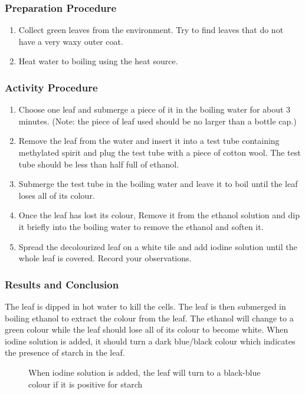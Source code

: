 \subsubsection*{Preparation Procedure}
\begin{enumerate}
\item{Collect green leaves from the environment. Try to find leaves that do not have a very waxy outer coat.}
\item{Heat water to boiling using the heat source.}
\end{enumerate}

\subsubsection*{Activity Procedure}
\begin{enumerate}
\item{Choose one leaf and submerge a piece of it in the boiling water for about 3 minutes. (Note: the piece of leaf used should be no larger than a bottle cap.)}
\item{Remove the leaf from the water and insert it into a test tube containing methylated spirit and plug the test tube with a piece of cotton wool. The test tube should be less than half full of ethanol.}
\item{Submerge the test tube in the boiling water and leave it to boil until the leaf loses all of its colour.}
\item{Once the leaf has lost its colour, Remove it from the ethanol solution and dip it briefly into the boiling water to remove the ethanol and soften it.}
\item{Spread the decolourized leaf on a white tile and add iodine solution until the whole leaf is covered. Record your observations.}
\end{enumerate}

\subsubsection*{Results and Conclusion}
The leaf is dipped in hot water to kill the cells. The leaf is then submerged in boiling ethanol to extract the colour from the leaf. The ethanol will change to a green colour while the leaf should lose all of its colour to become white. When iodine solution is added, it should turn a dark blue/black colour which indicates the presence of starch in the leaf.

\begin{figure}[h]
\begin{center}
\def\svgwidth{6cm}

\caption{When iodine solution is added, the leaf will turn to a black-blue colour if it is positive for starch}
\label{fig:starch}
\end{center}
\end{figure}

